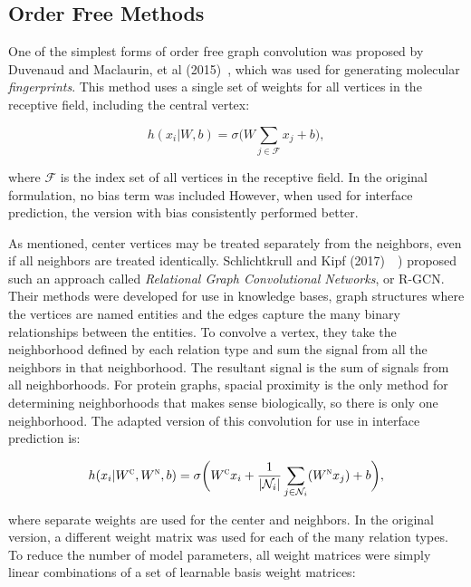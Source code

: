 \subsection{Order Free Methods}
One of the simplest forms of order free graph convolution was proposed by Duvenaud and Maclaurin, et al (2015)~\cite{duvenaud2015}, which was used for generating molecular \emph{fingerprints}.
This method uses a single set of weights for all vertices in the receptive field, including the central vertex:

\begin{equation}
h(x_i | W, b)= \sigma \bigg( W \sum_{j \in \mathcal{F}}x_j + b\bigg),
\label{eq:fingerprint}
\end{equation}

\noindent
where $\mathcal{F}$ is the index set of all vertices in the receptive field.
In the original formulation, no bias term was included
However, when used for interface prediction, the version with bias consistently performed better.

As mentioned, center vertices may be treated separately from the neighbors, even if all neighbors are treated identically. 
Schlichtkrull and Kipf (2017)~~\cite{schlichtkrull2017}) proposed such an approach called \emph{Relational Graph Convolutional Networks}, or R-GCN.
Their methods were developed for use in knowledge bases, graph structures where the vertices are named entities and the edges capture the many binary relationships between the entities. 
To convolve a vertex, they take the neighborhood defined by each relation type and sum the signal from all the neighbors in that neighborhood.
The resultant signal is the sum of signals from all neighborhoods.
For protein graphs, spacial proximity is the only method for determining neighborhoods that makes sense biologically, so there is only one neighborhood.
The adapted version of this convolution for use in interface prediction is:

\begin{equation}
h(x_i | W^\textsc{c}, W^\textsc{n}, b)= \sigma \bigg( W^\textsc{c} x_i + \frac{1}{|\mathcal{N}_i|} \sum_{j \in \mathcal{N}_i}(W^\textsc{n} x_j)  + b\bigg),
\label{eq:rgcn}
\end{equation}

\noindent
where separate weights are used for the center and neighbors. 
In the original version, a different weight matrix was used for each of the many relation types.  
To reduce the number of model parameters, all weight matrices were simply linear combinations of a set of learnable basis weight matrices:

